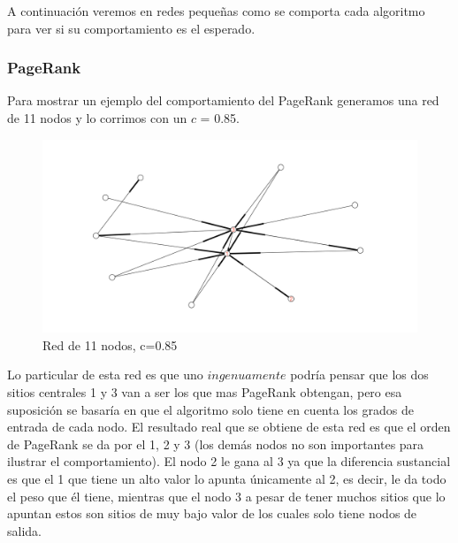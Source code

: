A continuación veremos en redes pequeñas como se comporta cada algoritmo para ver si su comportamiento es el esperado.

\subsubsection{PageRank}
Para mostrar un ejemplo del comportamiento del PageRank generamos una red de 11 nodos y lo corrimos con un $c$ = 0.85.

 \begin{figure}[!htb]
\begin{center}
    \includegraphics[scale=0.5]{imagenes/test5.png}
    \caption{Red de 11 nodos, c=0.85}
    \end{center}
\end{figure}

Lo particular de esta red es que uno $ingenuamente$ podría pensar que los dos sitios centrales 1 y 3 van a ser los que mas PageRank obtengan, pero esa suposición se basaría en que el algoritmo solo tiene en cuenta los grados de entrada de cada nodo. 
El resultado real que se obtiene de esta red es que el orden de PageRank se da por el 1, 2 y 3 (los demás nodos no son importantes para ilustrar el comportamiento). El nodo 2 le gana al 3 ya que la diferencia sustancial es que el 1 que tiene un alto valor lo apunta únicamente al 2, es decir, le da todo el peso que él tiene, mientras que el nodo 3 a pesar de tener muchos sitios que lo apuntan estos son sitios de muy bajo valor de los cuales solo tiene nodos de salida.

